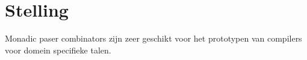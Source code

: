 

\usepackage[dutch]{babel}
\usepackage{csquotes}
\usepackage[titletoc,title]{appendix}
\usepackage{amsthm}
\usepackage{bookmark} %
\addto\captionsdutch{\renewcommand{\appendixname}{Bijlage}} %

\renewcommand{\appendixtocname}{Opdrachten}

\usepackage[
    backend=biber,
    style=ieee,
    sortlocale=nl_NL,
    url=false,
    doi=false,
    eprint=false
]{biblatex}



\newcommand{\lrTitle}{Bouwplan}
\newcommand{\lrAuthor}{\renewcommand\@d{{%
    \vspace{-\baselineskip}%
    \large\centering
    \begin{tabular}{@{}c@{}}
      Sjors Sparreboom\textsuperscript{1} \\
      \normalsize 0890040
    \end{tabular}%
    \quad en\quad
    \begin{tabular}{@{}c@{}}
      Johan Bos\textsuperscript{2} \\
      \normalsize 0878090
    \end{tabular}

    \bigskip

    \textsuperscript{1}CMI, Hogeschool Rotterdam \par
    \textsuperscript{2}CMI, Hogeschool Rotterdam

    \bigskip

    \today
  }}
}
\newcommand{\lrDate}{\today}

\toggletrue{lrHideToc}               %
\toggletrue{lrSmallHeadings}         %
\toggletrue{lrShowCover}             %


\nocite{*}

\section{Stelling}

Monadic paser combinators zijn zeer geschikt voor het prototypen van compilers
voor domein specifieke talen.

